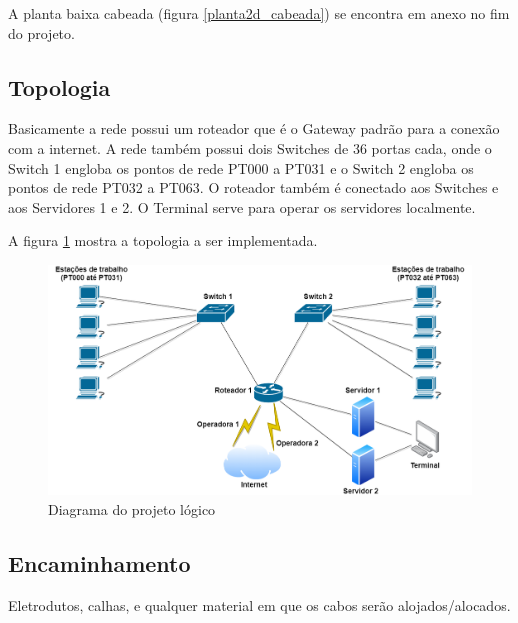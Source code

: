 \documentclass[	DIV=calc,%
							paper=a4,%
							fontsize=12pt,%
							onecolumn]{scrartcl}	 					%
\begin{document}
A planta baixa cabeada (figura \ref{planta2d_cabeada}) se encontra em anexo no fim do projeto. 

\subsection{Topologia}

Basicamente a rede possui um roteador que é o Gateway padrão para a conexão com a internet. A rede também possui dois Switches de 36 portas cada, onde o Switch 1 engloba os pontos de rede PT000 a PT031 e o Switch 2 engloba os pontos de rede PT032 a PT063. O roteador também é conectado aos Switches e aos Servidores 1 e 2. O Terminal serve para operar os servidores localmente. 

A figura \ref{topologia} mostra a topologia a ser implementada.

\begin{figure}
	\centering
	\includegraphics[width=\textwidth]{topologia}
	\caption{Diagrama do projeto lógico}
	\label{topologia}
\end{figure}




% 


\subsection{Encaminhamento}
Eletrodutos, calhas, e qualquer material em que os cabos serão alojados/alocados.
\end{document}
